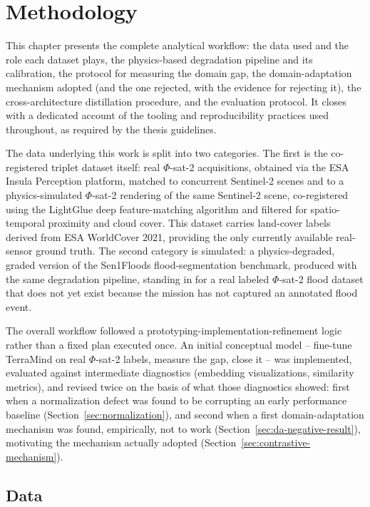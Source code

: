 \chapter{Methodology}
\label{chap:methodology}

This chapter presents the complete analytical workflow: the data used and the role each dataset plays, the physics-based degradation pipeline and its calibration, the protocol for measuring the domain gap, the domain-adaptation mechanism adopted (and the one rejected, with the evidence for rejecting it), the cross-architecture distillation procedure, and the evaluation protocol.
It closes with a dedicated account of the tooling and reproducibility practices used throughout, as required by the thesis guidelines.

The data underlying this work is split into two categories.
The first is the co-registered triplet dataset itself: real $\Phi$-sat-2 acquisitions, obtained via the ESA Insula Perception platform, matched to concurrent Sentinel-2 scenes and to a physics-simulated $\Phi$-sat-2 rendering of the same Sentinel-2 scene, co-registered using the LightGlue deep feature-matching algorithm \cite{Lindenberger_2023_ICCV} and filtered for spatio-temporal proximity and cloud cover.
This dataset carries land-cover labels derived from ESA WorldCover 2021, providing the only currently available real-sensor ground truth.
The second category is simulated: a physics-degraded, graded version of the Sen1Floods flood-segmentation benchmark, produced with the same degradation pipeline, standing in for a real labeled $\Phi$-sat-2 flood dataset that does not yet exist because the mission has not captured an annotated flood event.

The overall workflow followed a prototyping-implementation-refinement logic rather than a fixed plan executed once.
An initial conceptual model -- fine-tune TerraMind on real $\Phi$-sat-2 labels, measure the gap, close it -- was implemented, evaluated against intermediate diagnostics (embedding visualizations, similarity metrics), and revised twice on the basis of what those diagnostics showed: first when a normalization defect was found to be corrupting an early performance baseline (Section~\ref{sec:normalization}), and second when a first domain-adaptation mechanism was found, empirically, not to work (Section~\ref{sec:da-negative-result}), motivating the mechanism actually adopted (Section~\ref{sec:contrastive-mechanism}).

\section{Data}
\label{sec:data}

